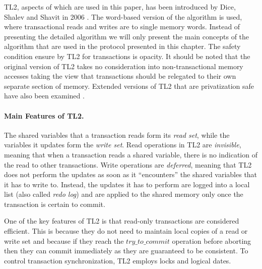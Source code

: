 TL2, aspects of which are used in this paper, has been introduced by Dice, Shalev and Shavit in 2006 \cite{dice06}.
The word-based version of the algorithm is used, %
where transactional reads and writes are to single memory words.
Instead of presenting the detailed algorithm we will only present the main concepts of the algorithm
that are used in the protocol presented in this chapter.
The safety condition ensure by TL2 for transactions is opacity.
It should be noted that the original version of TL2 takes no consideration into non-transactional memory
accesses taking the view that transactions should be relegated to their own separate section of memory.
Extended versions of TL2 that are privatization safe have also been examined \cite{DSS10}.
\paragraph{Main Features of TL2.} The shared variables  that a  transaction reads form its {\it read
set}, while the variables it updates form the {\it write set}. 
Read operations in TL2 are {\it invisible},  meaning  that when  a  transaction reads  a  shared 
variable,  there is no indication of the read to other transactions.  Write operations are  
{\it deferred}, meaning that  TL2 does not perform the updates  as soon as  it {}``encounters'' 
the shared  variables that  it has to write to. Instead, the 
updates it has to perform are logged into a local list (also called {\it redo log}) and   are  applied 
to the shared  memory only once the transaction is certain  to commit.

One of the key features of TL2 is that read-only transactions are considered efficient.
This is because they do not need to maintain 
local copies of a read or write set  and because if they reach the $try\_to\_commit$
operation before aborting then they can commit immediately as they are guaranteed
to be consistent.
To control transaction synchronization, TL2 employs locks and logical dates. 



